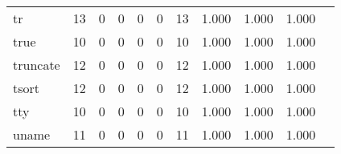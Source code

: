 \begin{longtable}{lp{1.2cm}p{1.2cm}p{1.2cm}p{1.2cm}p{1.2cm}p{1.2cm}p{1.2cm}p{1.2cm}p{1.2cm}p{1.2cm}}
tr        &                                    13 &                                                  0 &                                                  0 &                                                  0 &                                                  0 &                                                 13 &                                              1.000 &                                              1.000 &                                              1.000 \\
true      &                                    10 &                                                  0 &                                                  0 &                                                  0 &                                                  0 &                                                 10 &                                              1.000 &                                              1.000 &                                              1.000 \\
truncate  &                                    12 &                                                  0 &                                                  0 &                                                  0 &                                                  0 &                                                 12 &                                              1.000 &                                              1.000 &                                              1.000 \\
tsort     &                                    12 &                                                  0 &                                                  0 &                                                  0 &                                                  0 &                                                 12 &                                              1.000 &                                              1.000 &                                              1.000 \\
tty       &                                    10 &                                                  0 &                                                  0 &                                                  0 &                                                  0 &                                                 10 &                                              1.000 &                                              1.000 &                                              1.000 \\
uname     &                                    11 &                                                  0 &                                                  0 &                                                  0 &                                                  0 &                                                 11 &                                              1.000 &                                              1.000 &                                              1.000 \\

\end{longtable}
